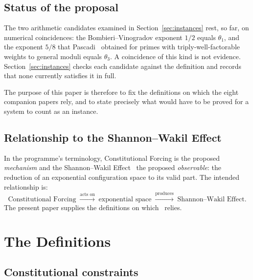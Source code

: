 \documentclass[12pt]{amsart}
\theoremstyle{plain}
\theoremstyle{definition}
\theoremstyle{remark}
\begin{document}
\subsection{Status of the proposal}

The two arithmetic candidates examined in Section~\ref{sec:instances} rest, so
far, on numerical coincidences: the Bombieri--Vinogradov exponent $1/2$ equals
$\theta_1$, and the exponent $5/8$ that Pascadi~\cite{Pascadi2025} obtained for
primes with triply-well-factorable weights to general moduli equals $\theta_3$.
A coincidence of this kind is not evidence. Section~\ref{sec:instances} checks
each candidate against the definition and records that none currently satisfies
it in full.

The purpose of this paper is therefore to fix the definitions on which the
eight companion papers rely, and to state precisely what would have to be
proved for a system to count as an instance.

\subsection{Relationship to the Shannon--Wakil Effect}

In the programme's terminology, Constitutional Forcing is the proposed
\emph{mechanism} and the Shannon--Wakil Effect~\cite{WakilShannon} the proposed
\emph{observable}: the reduction of an exponential configuration space to its
valid part. The intended relationship is:
\[
  \text{Constitutional Forcing}
  \;\xrightarrow{\text{acts on}}\;
  \text{exponential space}
  \;\xrightarrow{\text{produces}}\;
  \text{Shannon--Wakil Effect}.
\]
The present paper supplies the definitions on which~\cite{WakilShannon} relies.

\section{The Definitions}
\label{sec:definitions}

\subsection{Constitutional constraints}
\end{document}
